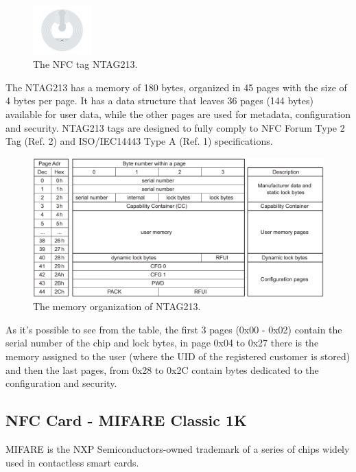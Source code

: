 \documentclass[target=bach,aauheader=,style=]{thud}
\begin{document}
\begin{figure}
	\centering
	\includegraphics[width=0.2\textwidth]{ntag213}
	\caption{The NFC tag NTAG213.}
	\label{fig:ntag213}
\end{figure} 


The NTAG213 has a memory of 180 bytes, organized in 45 pages with the size of 4 bytes per page. It has a data structure that leaves 36 pages (144 bytes) available for user data, while the other pages are used for metadata, configuration and security.
NTAG213 tags are designed to fully comply to NFC Forum Type 2 Tag (Ref. 2) and
ISO/IEC14443 Type A (Ref. 1) specifications.

\begin{figure}[h!]
	\centering
	\includegraphics[width=1.05\textwidth]{ntag213memory}
	\caption{The memory organization of NTAG213.}
	\label{fig:ntag213memory}
\end{figure}

As it's possible to see from the table, the first 3 pages (0x00 - 0x02) contain the serial number of the chip and lock bytes, in page 0x04 to 0x27 there is the memory assigned to the user (where the UID of the registered customer is stored) and then the last pages, from 0x28 to 0x2C contain bytes dedicated to the configuration and security. 


\subsection{NFC Card - MIFARE Classic 1K}
MIFARE is the NXP Semiconductors-owned trademark of a series of chips widely used in contactless smart cards. 
\end{document}
